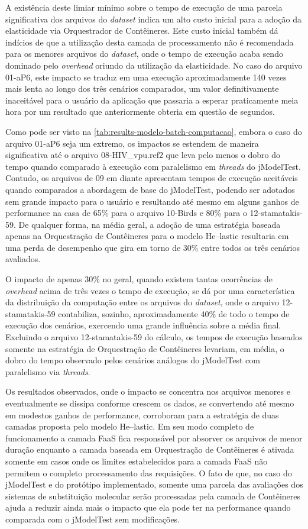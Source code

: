 \documentclass[english,brazilian]{UNISINOSmonografia} %
\begin{document}
A existência deste limiar mínimo sobre o tempo de execução de uma parcela significativa dos arquivos do \textit{dataset} indica um alto custo inicial para a adoção da elasticidade via Orquestrador de Contêineres.
%
Este custo inicial também dá indícios de que a utilização desta camada de processamento não é recomendada para os menores arquivos do \textit{dataset}, onde o tempo de execução acaba sendo dominado pelo \textit{overhead} oriundo da utilização da elasticidade.
%
No caso do arquivo 01-aP6, este impacto se traduz em uma execução aproximadamente 140 vezes mais lenta ao longo dos três cenários comparados, um valor definitivamente inaceitável para o usuário da aplicação que passaria a esperar praticamente meia hora por um resultado que anteriormente obteria em questão de segundos.


Como pode ser visto na \autoref{tab:results-modelo-batch-computacao}, embora o caso do arquivo 01-aP6 seja um extremo, os impactos se estendem de maneira significativa até o arquivo 08-HIV\_vpu.ref2 que leva pelo menos o dobro do tempo quando comparado à execução com paralelismo em \textit{threads} do jModelTest.
%
Contudo, os arquivos de 09 em diante apresentam tempos de execução aceitáveis quando comparados a abordagem de base do jModelTest, podendo ser adotados sem grande impacto para o usuário e resultando até mesmo em alguns ganhos de performance na casa de 65\% para o arquivo 10-Birds e 80\% para o 12-stamatakis-59.
%
De qualquer forma, na média geral, a adoção de uma estratégia baseada apenas na Orquestração de Contêineres para o modelo \textsf{He}--lastic resultaria em uma perda de desempenho que gira em torno de 30\% entre todos os três cenários avaliados.


O impacto de apenas 30\% no geral, quando existem tantas ocorrências de \textit{overhead} acima de três vezes o tempo de execução, se dá por uma característica da distribuição da computação entre os arquivos do \textit{dataset}, onde o arquivo 12-stamatakis-59 contabiliza, sozinho, aproximadamente 40\% de todo o tempo de execução dos cenários, exercendo uma grande influência sobre a média final.
%
Excluindo o arquivo 12-stamatakis-59 do cálculo, os tempos de execução baseados somente na estratégia de Orquestração de Contêineres levariam, em média, o dobro do tempo observado pelos cenários análogos do jModelTest com paralelismo via \textit{threads}.


Os resultados observados, onde o impacto se concentra nos arquivos menores e eventualmente se dissipa conforme crescem os dados, se convertendo até mesmo em modestos ganhos de performance, corroboram para a estratégia de duas camadas proposta pelo modelo \textsf{He}--lastic.
%
Em seu modo completo de funcionamento a camada FaaS fica responsável por absorver os arquivos de menor duração enquanto a camada baseada em Orquestração de Contêineres é ativada somente em casos onde os limites estabelecidos para a camada FaaS não permitem o completo processamento das requisições.
%
O fato de que, no caso do jModelTest e do protótipo implementado, somente uma parcela das avaliações dos sistemas de substituição molecular serão processadas pela camada de Contêineres ajuda a reduzir ainda mais o impacto que ela pode ter na performance quando comparada com o jModelTest sem modificações.
\end{document}

